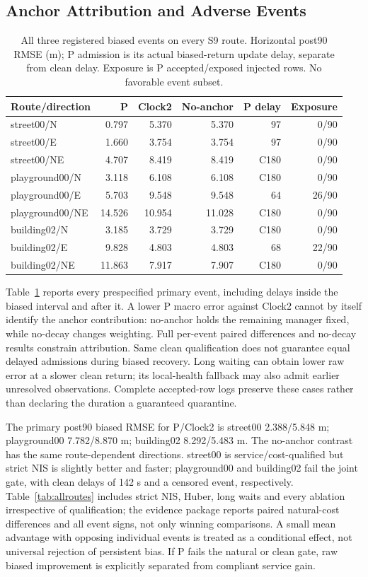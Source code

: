 \documentclass[conference]{IEEEtran}
\begin{document}
\subsection{Anchor Attribution and Adverse Events}
\begin{table}[t]\centering\scriptsize\setlength{\tabcolsep}{3pt}
\caption{All three registered biased events on every S9 route. Horizontal post90 RMSE (m); P admission is its actual biased-return update delay, separate from clean delay. Exposure is P accepted/exposed injected rows. No favorable event subset.}\label{tab:events}
\begin{tabular}{lrrrrr}\toprule
Route/direction & P & Clock2 & No-anchor & P delay & Exposure\\\midrule
street00/N & 0.797 & 5.370 & 5.370 & 97 & 0/90 \\
street00/E & 1.660 & 3.754 & 3.754 & 97 & 0/90 \\
street00/NE & 4.707 & 8.419 & 8.419 & C180 & 0/90 \\
playground00/N & 3.118 & 6.108 & 6.108 & C180 & 0/90 \\
playground00/E & 5.703 & 9.548 & 9.548 & 64 & 26/90 \\
playground00/NE & 14.526 & 10.954 & 11.028 & C180 & 0/90 \\
building02/N & 3.185 & 3.729 & 3.729 & C180 & 0/90 \\
building02/E & 9.828 & 4.803 & 4.803 & 68 & 22/90 \\
building02/NE & 11.863 & 7.917 & 7.907 & C180 & 0/90 \\
\bottomrule\end{tabular}\end{table}
Table~\ref{tab:events} reports every prespecified primary event, including delays inside the biased interval and after it. A lower P macro error against Clock2 cannot by itself identify the anchor contribution: no-anchor holds the remaining manager fixed, while no-decay changes weighting. Full per-event paired differences and no-decay results constrain attribution. Same clean qualification does not guarantee equal delayed admissions during biased recovery. Long waiting can obtain lower raw error at a slower clean return; its local-health fallback may also admit earlier unresolved observations. Complete accepted-row logs preserve these cases rather than declaring the duration a guaranteed quarantine.

The primary post90 biased RMSE for P/Clock2 is street00 2.388/5.848 m; playground00 7.782/8.870 m; building02 8.292/5.483 m. The no-anchor contrast has the same route-dependent directions. street00 is service/cost-qualified but strict NIS is slightly better and faster; playground00 and building02 fail the joint gate, with clean delays of 142 s and a censored event, respectively. Table~\ref{tab:allroutes} includes strict NIS, Huber, long waits and every ablation irrespective of qualification; the evidence package reports paired natural-cost differences and all event signs, not only winning comparisons. A small mean advantage with opposing individual events is treated as a conditional effect, not universal rejection of persistent bias. If P fails the natural or clean gate, raw biased improvement is explicitly separated from compliant service gain.
\end{document}
